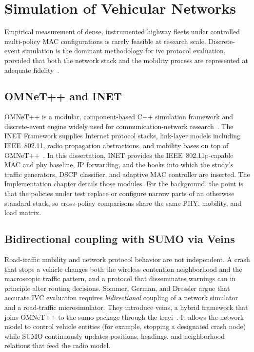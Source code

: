 \section{Simulation of Vehicular Networks}
\label{sec:bg:sim}

Empirical measurement of dense, instrumented highway fleets under controlled multi-policy MAC configurations is rarely feasible at research scale.
Discrete-event simulation is the dominant methodology for \gls{ivc} protocol evaluation, provided that both the network stack and the mobility process are represented at adequate fidelity~\cite{veins_sommer2011}.

\subsection{OMNeT++ and INET}
\label{sec:bg:omnet}

OMNeT++ is a modular, component-based C++ simulation framework and discrete-event engine widely used for communication-network research~\cite{varga2008omnetpp}.
The INET Framework supplies Internet protocol stacks, link-layer models including IEEE~802.11, radio propagation abstractions, and mobility bases on top of OMNeT++~\cite{inet_framework}.
In this dissertation, INET provides the IEEE~802.11p-capable MAC and \gls{phy} baseline, IP forwarding, and the hooks into which the study's traffic generators, DSCP classifier, and adaptive MAC controller are inserted.
The Implementation chapter details those modules.
For the background, the point is that the policies under test replace or configure narrow parts of an otherwise standard stack, so cross-policy comparisons share the same PHY, mobility, and load matrix.

\subsection{Bidirectional coupling with SUMO via Veins}
\label{sec:bg:veins}

Road-traffic mobility and network protocol behavior are not independent.
A crash that stops a vehicle changes both the wireless contention neighborhood and the macroscopic traffic pattern, and a protocol that disseminates warnings can in principle alter routing decisions.
Sommer, German, and Dressler argue that accurate IVC evaluation requires \emph{bidirectional} coupling of a network simulator and a road-traffic microsimulator.
They introduce \gls{veins}, a hybrid framework that joins OMNeT++ to the \gls{sumo} package through the \gls{traci}~\cite{veins_sommer2011}.
It allows the network model to control vehicle entities (for example, stopping a designated crash node) while SUMO continuously updates positions, headings, and neighborhood relations that feed the radio model.

